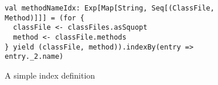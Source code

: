 \begin{figure}
\centering
\begin{lstlisting}
val methodNameIdx: Exp[Map[String, Seq[(ClassFile, Method)]]] = (for {
  classFile <- classFiles.asSquopt
  method <- classFile.methods
} yield (classFile, method)).indexBy(entry => entry._2.name)
\end{lstlisting}
\caption{A simple index definition}
\label{fig:indexes}
\end{figure}

